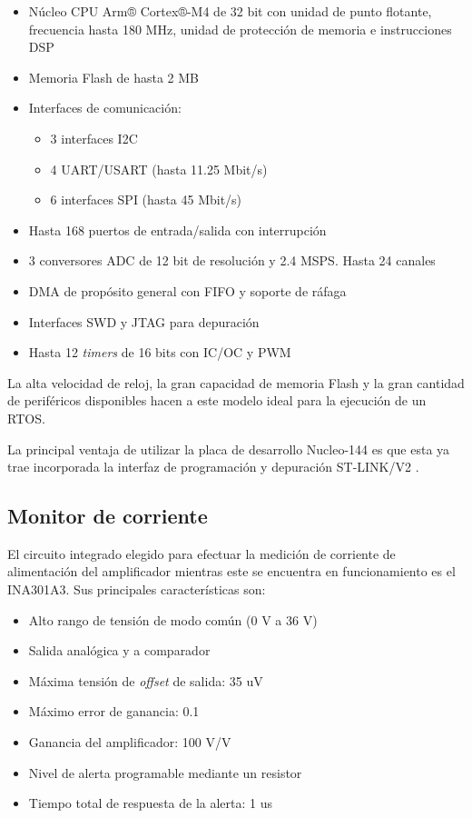\begin{itemize}
\item Núcleo CPU Arm® Cortex®-M4 de 32 bit con unidad de punto flotante, frecuencia hasta 180 MHz, unidad de protección de memoria e instrucciones DSP
\item Memoria Flash de hasta 2 MB
\item Interfaces de comunicación:
	\begin{itemize}
	\item 3 interfaces I2C
	\item 4 UART/USART (hasta 11.25 Mbit/s)
	\item 6 interfaces SPI (hasta 45 Mbit/s)
	\end{itemize}
\item Hasta 168 puertos de entrada/salida con interrupción
\item 3 conversores ADC de 12 bit de resolución y 2.4 MSPS. Hasta 24 canales
\item DMA de propósito general con FIFO y soporte de ráfaga
\item Interfaces SWD y JTAG para depuración
\item Hasta 12 \textit{timers} de 16 bits con IC/OC y PWM
\end{itemize}

La alta velocidad de reloj, la gran capacidad de memoria Flash y la gran cantidad de periféricos disponibles hacen a este modelo ideal para la ejecución de un RTOS.

La principal ventaja de utilizar la placa de desarrollo Nucleo-144 es que esta ya trae incorporada la interfaz de programación y depuración ST-LINK/V2 \citep{NUCLEO144}.

\subsection{Monitor de corriente}

El circuito integrado elegido para efectuar la medición de corriente de alimentación del amplificador mientras este se encuentra en funcionamiento es el INA301A3. Sus principales características son:

\begin{itemize}
\item Alto rango de tensión de modo común (0 V a 36 V)
\item Salida analógica y a comparador
\item Máxima tensión de \textit{offset} de salida: 35 uV
\item Máximo error de ganancia: 0.1%
\item Ganancia del amplificador: 100 V/V
\item Nivel de alerta programable mediante un resistor
\item Tiempo total de respuesta de la alerta: 1 us
\end{itemize}


